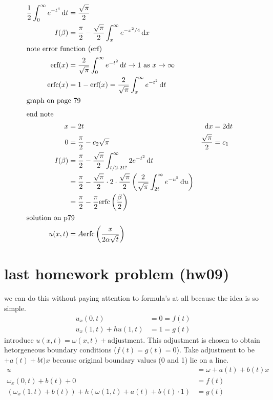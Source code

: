 \documentclass{article}
\begin{document}
\begin{align*}
  \frac{1}{2}\int_0^\infty{e^{-t^4}\,\mathrm{d}t}&=\frac{\sqrt{\pi }}{2}\\
  I(\beta )&=\frac{\pi }{2}-\frac{\sqrt{\pi }}{2}\int_x^\infty{e^{-x^2/4}\,\mathrm{d}x}\\
  \intertext{note error function (erf)}
  \text{erf}(x)&=\frac{2}{\sqrt{\pi }}\int_0^\infty{e^{-t^2}\,\mathrm{d}t}\to1 \text{ as }x\to\infty\\
  \text{erfc}(x)&=1-\text{erf}(x)=\frac{2}{\sqrt{\pi }}\int_x^\infty{e^{-t^2}\,\mathrm{d}t}\\
  \intertext{graph on page 79}
  \intertext{end note}
  x&=2t&\mathrm{d}x&=2\mathrm{d}t\\
  0&=\frac{\pi }{2}-c_2\sqrt{\pi }&\frac{\sqrt{\pi }}{2}&=c_1\\
  I(\beta )&=\frac{\pi }{2}-\frac{\sqrt{\pi} }{2}\int_{t/2\cdot2t?}^\infty{2e^{-t^2}\,\mathrm{d}t}\\
  &=\frac{\pi }{2}-\frac{\sqrt{\pi }}{2}\cdot2\cdot\frac{\sqrt{\pi }}{2}\left(\frac{2}{\sqrt{\pi }}\int_{2t}^\infty{e^{-u^2}\,\mathrm{d}u}\right)\\
  &=\frac{\pi }{2}-\frac{\pi }{2}\text{erfc}\left(\frac{\beta }{2}\right)\\
  \intertext{solution on p79}
  u(x,t)&=A\text{erfc}\left(\frac{x}{2\alpha \sqrt{t}}\right)
\end{align*}
\section*{last homework problem (hw09)}
we can do this without paying attention to formula's at all because the idea is so simple.
\begin{align*}
  u_x(0,t)&=0=f(t)\\
  u_x(1,t)+hu(1,t)&=1=g(t)
\end{align*}
introduce $u(x,t)=\omega (x,t)+\text{adjustment}$. This adjustment is chosen to obtain hetorgeneous boundary conditions ($f(t)=g(t)=0$). Take adjustment to be $+a(t)+bt)x$ because original boundary values (0 and 1) lie on a line.
\begin{align*}
  u&=\omega +a(t)+b(t)x\\
  \omega_x(0,t)+b(t)+0&=f(t)\\
  (\omega_x(1,t)+b(t))+h(\omega (1,t)+a(t)+b(t)\cdot1)&=g(t)
\end{align*}
\end{document}
